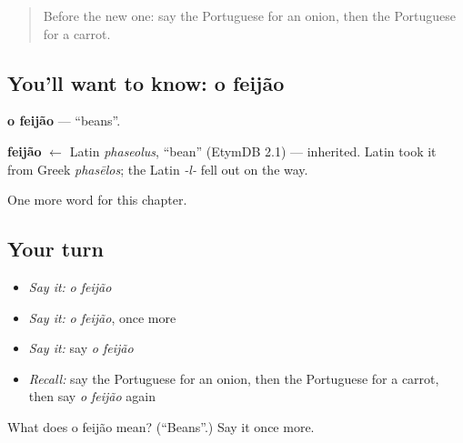 \label{lesson:PT-C46-feijao}



\begin{quote}
Before the new one: say the Portuguese for an onion, then the Portuguese for a carrot.
\end{quote}

\subsection*{You'll want to know: o feijão}
\textbf{o feijão} — \textquotedblleft{}beans\textquotedblright{}.

\begin{cousinweb}
\textbf{feijão} $\leftarrow$ Latin \emph{phaseolus}, \textquotedblleft{}bean\textquotedblright{} (EtymDB 2.1) — inherited. Latin took it from Greek \emph{phasēlos}; the Latin \emph{-l-} fell out on the way.
\end{cousinweb}

\begin{grammarlens}[title={What you've built}]
One more word for this chapter.
\end{grammarlens}

\subsection*{Your turn}
\begin{itemize}
\raggedright
  \item \emph{Say it:} \emph{o feijão}
  \item \emph{Say it:} \emph{o feijão}, once more
  \item \emph{Say it:} say \emph{o feijão}
  \item \emph{Recall:} say the Portuguese for an onion, then the Portuguese for a carrot, then say \emph{o feijão} again
\end{itemize}

\begin{tcolorbox}[breakable,colback=teal!4,colframe=teal!35!black,title={Before you move on}]
What does o feijão mean? (\textquotedblleft{}Beans\textquotedblright{}.) Say it once more.
\end{tcolorbox}
